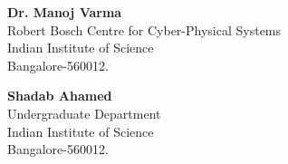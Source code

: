 \documentclass[12pt]{report}
\begin{document}
\vspace{18ex}
\begin{minipage}{2.5in}
\textbf{Dr. Manoj Varma} \\ Robert Bosch Centre for Cyber-Physical Systems\\ {Indian Institute of Science}\\
{Bangalore-560012.}
\end{minipage}
\hfill
\begin{minipage}{2.5in}
\begin{flushright}
\textbf{Shadab Ahamed} \\ {Undergraduate Department} \\ {Indian Institute of Science}\\
{Bangalore-560012.}
\end{flushright}
\end{minipage}

\newpage
\thispagestyle{empty}
\begin{center}

\end{center}
\newpage
\end{document}
